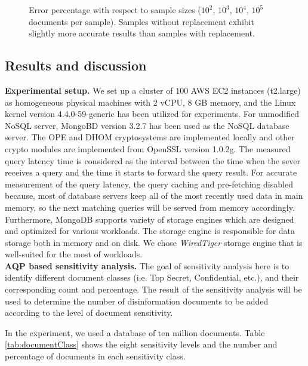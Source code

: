 \begin{figure}[H]
\centering
\resizebox{0.5\textwidth}{!}{}
\caption{Error percentage with respect to sample sizes ($10^2$, $10^3$, $10^4$, $10^5$ documents per sample). Samples without replacement exhibit slightly more accurate results than samples with replacement.}
\label{errorPercentageFigure}
\end{figure}

\subsection{Results and discussion}
\label{ResultAndDiscussionSubSection}

\noindent \textbf{ Experimental setup.} We set up a cluster of $100$ AWS EC2 instances (t2.large) as homogeneous physical machines with $2$ vCPU, $8$ GB memory, and the Linux kernel version 4.4.0-59-generic has been utilized for experiments. For unmodified NoSQL server, MongoBD version 3.2.7 has been used as the NoSQL database server. The OPE and DHOM cryptosystems are implemented locally and other crypto modules are implemented from OpenSSL version 1.0.2g. The measured query latency time is considered as the interval between the time when the sever receives a query and the time it starts to forward the query result. For accurate measurement of the query latency, the query caching and pre-fetching disabled because, most of database servers keep all of the most recently used data in main memory, so the next matching queries will be served from memory accordingly. Furthermore, MongoDB supports variety of storage engines which are designed and optimized for various workloads. The storage engine is responsible for data storage both in memory and on disk. We chose \emph{WiredTiger} storage engine that is well-suited for the most of workloads.\\



\noindent \textbf{ AQP based sensitivity analysis.} The goal of sensitivity analysis here is to identify different document classes (i.e. Top Secret, Confidential, etc.), and their corresponding count and percentage. The result of the sensitivity analysis will be used to determine the number of disinformation documents to be added according to the level of document sensitivity. 

In the experiment, we used a database of ten million documents. Table \ref{tab:documentClass} shows the eight sensitivity levels and the number and percentage of documents in each sensitivity class.   

